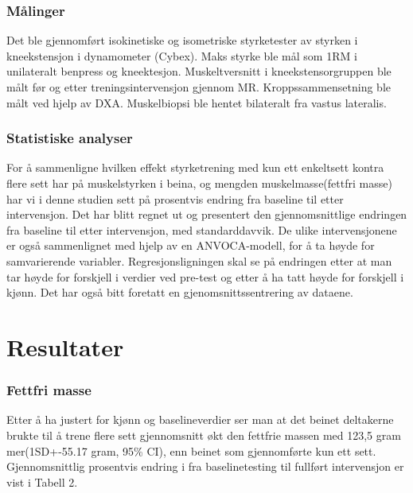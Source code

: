 \documentclass[
]{book}
\begin{document}
\hypertarget{muxe5linger}{%
\subsubsection{Målinger}\label{muxe5linger}}

Det ble gjennomført isokinetiske og isometriske styrketester av styrken i kneekstensjon i dynamometer (Cybex). Maks styrke ble mål som 1RM i unilateralt benpress og kneektesjon. Muskeltversnitt i kneekstensorgruppen ble målt før og etter treningsintervensjon gjennom MR. Kroppssammensetning ble målt ved hjelp av DXA. Muskelbiopsi ble hentet bilateralt fra vastus lateralis.

\hypertarget{statistiske-analyser}{%
\subsubsection{Statistiske analyser}\label{statistiske-analyser}}

For å sammenligne hvilken effekt styrketrening med kun ett enkeltsett kontra flere sett har på muskelstyrken i beina, og mengden muskelmasse(fettfri masse) har vi i denne studien sett på prosentvis endring fra baseline til etter intervensjon. Det har blitt regnet ut og presentert den gjennomsnittlige endringen fra baseline til etter intervensjon, med standarddavvik. De ulike intervensjonene er også sammenlignet med hjelp av en ANVOCA-modell, for å ta høyde for samvarierende variabler. Regresjonsligningen skal se på endringen etter at man tar høyde for forskjell i verdier ved pre-test og etter å ha tatt høyde for forskjell i kjønn. Det har også bitt foretatt en gjenomsnittssentrering av dataene.

\hypertarget{resultater-3}{%
\section{Resultater}\label{resultater-3}}

\hypertarget{fettfri-masse}{%
\subsubsection{Fettfri masse}\label{fettfri-masse}}

Etter å ha justert for kjønn og baselineverdier ser man at det beinet deltakerne brukte til å trene flere sett gjennomsnitt økt den fettfrie massen med 123,5 gram mer(1SD+-55.17 gram, 95\% CI), enn beinet som gjennomførte kun ett sett. Gjennomsnittlig prosentvis endring i fra baselinetesting til fullført intervensjon er vist i Tabell 2.
\end{document}

